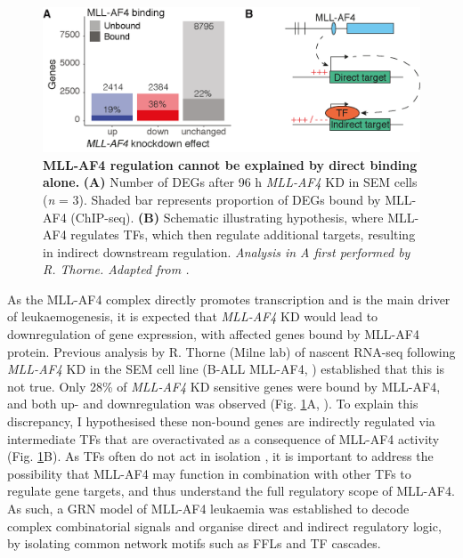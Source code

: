 \begin{figure}[!t]
    \centering
    \includegraphics{figures/chapter4/ch4_grn-justification.png}
    \caption[{MLL-AF4 regulation cannot be explained by direct binding alone.}]
    {\textbf{MLL-AF4 regulation cannot be explained by direct binding alone.} 
    \textbf{(A)} Number of DEGs after 96 h \textit{MLL-AF4} KD in SEM cells (\textit{n} = 3). Shaded bar represents proportion of DEGs bound by MLL-AF4 (ChIP-seq). 
    \textbf{(B)} Schematic illustrating hypothesis, where MLL-AF4 regulates TFs, which then regulate additional targets, resulting in indirect downstream regulation. 
    \textit{Analysis in A first performed by R. Thorne. Adapted from \cite{harman_kmt2a-aff1_2021}.}
    }
    \label{fig:ch4_GRN_just}
\end{figure}

As the MLL-AF4 complex directly promotes transcription \citep{ballabio_molecular_2012, biswas_function_2011, kerry_mll-af4_2017, mueller_role_2007, yokoyama_higher-order_2010, lin_aff4_2010, okuda_af4_2015} and is the main driver of leukaemogenesis, it is expected that \textit{MLL-AF4} KD would lead to downregulation of gene expression, with affected genes bound by MLL-AF4 protein. Previous analysis by R. Thorne (Milne lab) of nascent RNA-seq following \textit{MLL-AF4} KD \citep{godfrey_mll-af4_2017} in the SEM cell line (B-ALL MLL-AF4, \cite{greil_acute_1994}) established that this is not true. Only 28\% of \textit{MLL-AF4} KD sensitive genes were bound by MLL-AF4, and both up- and downregulation was observed (Fig. \ref{fig:ch4_GRN_just}A, \cite{harman_kmt2a-aff1_2021}). To explain this discrepancy, I hypothesised these non-bound genes are indirectly regulated via intermediate TFs that are overactivated as a consequence of MLL-AF4 activity (Fig. \ref{fig:ch4_GRN_just}B). As TFs often do not act in isolation \citep{morgunova_structural_2017, spitz_transcription_2012}, it is important to address the possibility that MLL-AF4 may function in combination with other TFs to regulate gene targets, and thus understand the full regulatory scope of MLL-AF4. As such, a GRN model of MLL-AF4 leukaemia was established to decode complex combinatorial signals and organise direct and indirect regulatory logic, by isolating common network motifs such as FFLs and TF cascades. 

